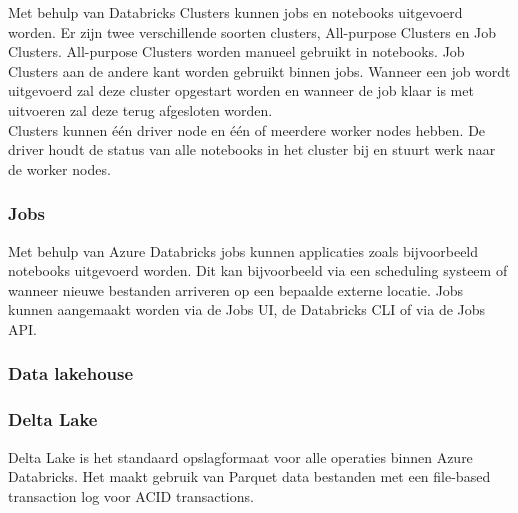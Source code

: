 Met behulp van Databricks Clusters kunnen jobs en notebooks uitgevoerd worden. Er zijn twee verschillende soorten clusters, All-purpose Clusters en Job Clusters. All-purpose Clusters worden manueel gebruikt in notebooks. Job Clusters aan de andere kant worden gebruikt binnen jobs. Wanneer een job wordt uitgevoerd zal deze cluster opgestart worden en wanneer de job klaar is met uitvoeren zal deze terug afgesloten worden.~\autocite{Samuel2021}\\

Clusters kunnen één driver node en één of meerdere worker nodes hebben. De driver houdt de status van alle notebooks in het cluster bij en stuurt werk naar de worker nodes.~\autocite{Samuel2021}

\subsubsection{Jobs}

Met behulp van Azure Databricks jobs kunnen applicaties zoals bijvoorbeeld notebooks uitgevoerd worden. Dit kan bijvoorbeeld via een scheduling systeem of wanneer nieuwe bestanden arriveren op een bepaalde externe locatie. Jobs kunnen aangemaakt worden via de Jobs UI, de Databricks CLI of via de Jobs API.~\autocite{Microsoft2024h}

%

\subsubsection{Data lakehouse}


\subsubsection{Delta Lake}

Delta Lake is het standaard opslagformaat voor alle operaties binnen Azure Databricks. Het maakt gebruik van Parquet data bestanden met een file-based transaction log voor ACID transactions.~\autocite{Microsoft2024c}

